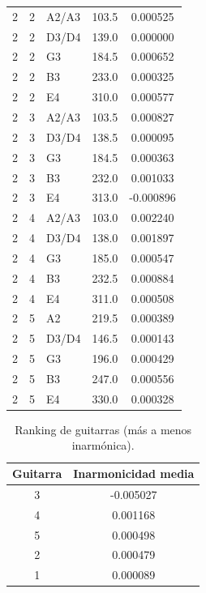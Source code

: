 \begin{table}[htbp]
\begin{tabular}{cclcc}
  2 & 2 & A2/A3 & 103.5 & 0.000525 \\
  2 & 2 & D3/D4 & 139.0 & 0.000000 \\
  2 & 2 & G3 & 184.5 & 0.000652 \\
  2 & 2 & B3 & 233.0 & 0.000325 \\
  2 & 2 & E4 & 310.0 & 0.000577 \\
  2 & 3 & A2/A3 & 103.5 & 0.000827 \\
  2 & 3 & D3/D4 & 138.5 & 0.000095 \\
  2 & 3 & G3 & 184.5 & 0.000363 \\
  2 & 3 & B3 & 232.0 & 0.001033 \\
  2 & 3 & E4 & 313.0 & -0.000896 \\
  2 & 4 & A2/A3 & 103.0 & 0.002240 \\
  2 & 4 & D3/D4 & 138.0 & 0.001897 \\
  2 & 4 & G3 & 185.0 & 0.000547 \\
  2 & 4 & B3 & 232.5 & 0.000884 \\
  2 & 4 & E4 & 311.0 & 0.000508 \\
  2 & 5 & A2 & 219.5 & 0.000389 \\
  2 & 5 & D3/D4 & 146.5 & 0.000143 \\
  2 & 5 & G3 & 196.0 & 0.000429 \\
  2 & 5 & B3 & 247.0 & 0.000556 \\
  2 & 5 & E4 & 330.0 & 0.000328 \\
  \bottomrule
  \end{tabular}
\end{table}

\begin{table}[htbp]
  \centering
 \small
  \caption{Ranking de guitarras (más a menos inarmónica).}
  \label{tab:ranking_guitarras}
  \begin{tabular}{cc}
  \toprule
  Guitarra & Inarmonicidad media \\
  \midrule
  3 & -0.005027 \\
  4 & 0.001168 \\
  5 & 0.000498 \\
  2 & 0.000479 \\
  1 & 0.000089 \\
  \bottomrule
  \end{tabular}
\end{table}

